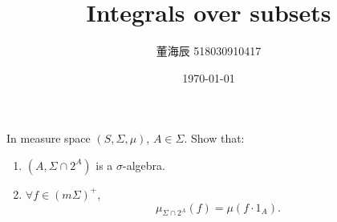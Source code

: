 

\title{Integrals over subsets}
\date{\today}
\author{董海辰 518030910417}


\maketitle

\begin{thm}{}{}
    In measure space $(S, \Sigma, \mu)$, $A \in \Sigma$. Show that:
    \begin{enumerate}
        \item $(A, \Sigma\cap 2^A)$ is a $\sigma $-algebra.
        \item $\forall f \in (m\Sigma)^+$, 
            $$\mu_{\Sigma\cap 2^A}(f) = \mu(f\cdot 1_A).$$
    \end{enumerate}
\end{thm}

